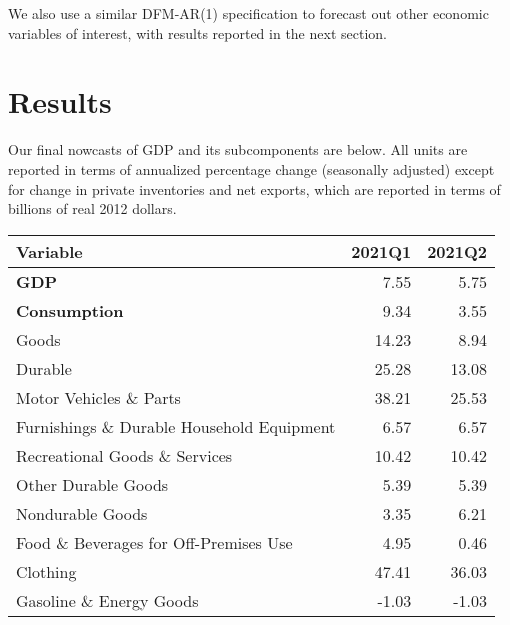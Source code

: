 \documentclass[11pt, letterpaper]{article}\usepackage[]{graphicx}\usepackage[]{color}
\begin{document}
We also use a similar DFM-AR(1) specification to forecast out other economic variables of interest, with results reported in the next section.


\section{Results}
Our final nowcasts of GDP and its subcomponents are below. All units are reported in terms of annualized percentage change (seasonally adjusted) except for change in private inventories and net exports, which are reported in terms of billions of real 2012 dollars.
\begin{table}[H]
\centering
\begingroup\fontsize{10pt}{12pt}\selectfont
\begin{tabular}{lrr}
  \hline
Variable & 2021Q1 & 2021Q2 \\ 
  \hline
\hspace{0mm} \textbf{GDP} & 7.55 & 5.75 \\ 
  \hspace{0mm} \textbf{Consumption} & 9.34 & 3.55 \\ 
  \hspace{8mm}  Goods & 14.23 & 8.94 \\ 
  \hspace{16mm}  Durable & 25.28 & 13.08 \\ 
  \hspace{24mm}  Motor Vehicles \& Parts & 38.21 & 25.53 \\ 
  \hspace{24mm}  Furnishings \& Durable Household Equipment & 6.57 & 6.57 \\ 
  \hspace{24mm}  Recreational Goods \& Services & 10.42 & 10.42 \\ 
  \hspace{24mm}  Other Durable Goods & 5.39 & 5.39 \\ 
  \hspace{16mm}  Nondurable Goods & 3.35 & 6.21 \\ 
  \hspace{24mm}  Food \& Beverages for Off-Premises Use & 4.95 & 0.46 \\ 
  \hspace{24mm}  Clothing & 47.41 & 36.03 \\ 
  \hspace{24mm}  Gasoline \& Energy Goods & -1.03 & -1.03 \\ 

\end{tabular}
\end{table}
\end{document}
